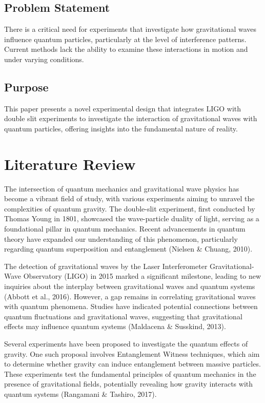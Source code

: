 \documentclass{article}
\begin{document}
\subsection{Problem Statement}
There is a critical need for experiments that investigate how gravitational waves influence quantum particles, particularly at the level of interference patterns. Current methods lack the ability to examine these interactions in motion and under varying conditions.

\subsection{Purpose}
This paper presents a novel experimental design that integrates LIGO with double slit experiments to investigate the interaction of gravitational waves with quantum particles, offering insights into the fundamental nature of reality.

\section{Literature Review}
The intersection of quantum mechanics and gravitational wave physics has become a vibrant field of study, with various experiments aiming to unravel the complexities of quantum gravity. The double-slit experiment, first conducted by Thomas Young in 1801, showcased the wave-particle duality of light, serving as a foundational pillar in quantum mechanics. Recent advancements in quantum theory have expanded our understanding of this phenomenon, particularly regarding quantum superposition and entanglement (Nielsen \& Chuang, 2010).

The detection of gravitational waves by the Laser Interferometer Gravitational-Wave Observatory (LIGO) in 2015 marked a significant milestone, leading to new inquiries about the interplay between gravitational waves and quantum systems (Abbott et al., 2016). However, a gap remains in correlating gravitational waves with quantum phenomena. Studies have indicated potential connections between quantum fluctuations and gravitational waves, suggesting that gravitational effects may influence quantum systems (Maldacena \& Susskind, 2013).

Several experiments have been proposed to investigate the quantum effects of gravity. One such proposal involves Entanglement Witness techniques, which aim to determine whether gravity can induce entanglement between massive particles. These experiments test the fundamental principles of quantum mechanics in the presence of gravitational fields, potentially revealing how gravity interacts with quantum systems (Rangamani \& Tashiro, 2017).
\end{document}
